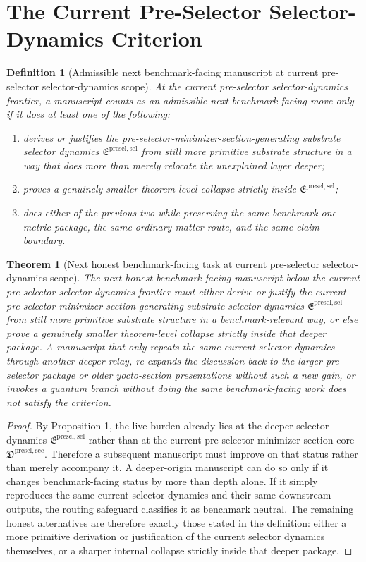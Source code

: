 \documentclass[11pt]{article}
\newcommand{\PreSelectorMinSectionCore}{\mathfrak D^{\mathrm{presel,sec}}}
\newcommand{\PreSectionSelectorPackage}{\mathfrak E^{\mathrm{presel,sel}}}
\newtheorem{definition}{Definition}
\newtheorem{theorem}{Theorem}
\begin{document}
\section{The Current Pre-Selector Selector-Dynamics Criterion}

\begin{definition}[Admissible next benchmark-facing manuscript at current pre-selector selector-dynamics scope]
At the current pre-selector selector-dynamics frontier, a manuscript counts as an admissible next benchmark-facing move only if it does at least one of the following:
\begin{enumerate}
    \item derives or justifies the pre-selector-minimizer-section-generating substrate selector dynamics \(\PreSectionSelectorPackage\) from still more primitive substrate structure in a way that does more than merely relocate the unexplained layer deeper;
    \item proves a genuinely smaller theorem-level collapse strictly inside \(\PreSectionSelectorPackage\);
    \item does either of the previous two while preserving the same benchmark one-metric package, the same ordinary matter route, and the same claim boundary.
\end{enumerate}
\end{definition}

\begin{theorem}[Next honest benchmark-facing task at current pre-selector selector-dynamics scope]
The next honest benchmark-facing manuscript below the current pre-selector selector-dynamics frontier must either derive or justify the current pre-selector-minimizer-section-generating substrate selector dynamics \(\PreSectionSelectorPackage\) from still more primitive substrate structure in a benchmark-relevant way, or else prove a genuinely smaller theorem-level collapse strictly inside that deeper package. A manuscript that only repeats the same current selector dynamics through another deeper relay, re-expands the discussion back to the larger pre-selector package or older yocto-section presentations without such a new gain, or invokes a quantum branch without doing the same benchmark-facing work does not satisfy the criterion.
\end{theorem}

\begin{proof}
By Proposition 1, the live burden already lies at the deeper selector dynamics \(\PreSectionSelectorPackage\) rather than at the current pre-selector minimizer-section core \(\PreSelectorMinSectionCore\). Therefore a subsequent manuscript must improve on that status rather than merely accompany it. A deeper-origin manuscript can do so only if it changes benchmark-facing status by more than depth alone. If it simply reproduces the same current selector dynamics and their same downstream outputs, the routing safeguard classifies it as benchmark neutral. The remaining honest alternatives are therefore exactly those stated in the definition: either a more primitive derivation or justification of the current selector dynamics themselves, or a sharper internal collapse strictly inside that deeper package.
\end{proof}
\end{document}

